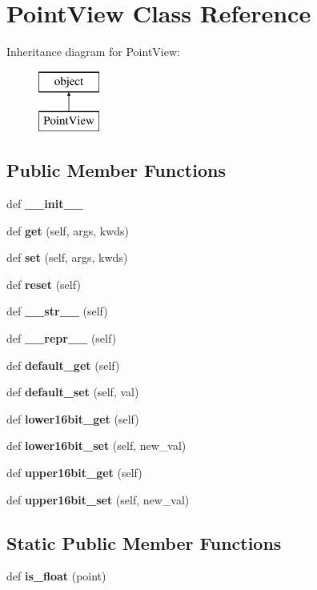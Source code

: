 \section{Point\+View Class Reference}
\label{classpoint_1_1_point_view}
Inheritance diagram for Point\+View\+:\begin{figure}[H]
\begin{center}
\leavevmode
\includegraphics[height=2.000000cm]{classpoint_1_1_point_view}
\end{center}
\end{figure}
\subsection*{Public Member Functions}
\begin{DoxyCompactItemize}
\item 
def {\bf \+\_\+\+\_\+init\+\_\+\+\_\+}
\item 
def {\bf get} (self, args, kwds)
\item 
def {\bf set} (self, args, kwds)
\item 
def {\bf reset} (self)
\item 
def {\bf \+\_\+\+\_\+str\+\_\+\+\_\+} (self)
\item 
def {\bf \+\_\+\+\_\+repr\+\_\+\+\_\+} (self)
\item 
def {\bf default\+\_\+get} (self)
\item 
def {\bf default\+\_\+set} (self, val)
\item 
def {\bf lower16bit\+\_\+get} (self)
\item 
def {\bf lower16bit\+\_\+set} (self, new\+\_\+val)
\item 
def {\bf upper16bit\+\_\+get} (self)
\item 
def {\bf upper16bit\+\_\+set} (self, new\+\_\+val)
\end{DoxyCompactItemize}
\subsection*{Static Public Member Functions}
\begin{DoxyCompactItemize}
\item 
def {\bf is\+\_\+float} (point)
\end{DoxyCompactItemize}
